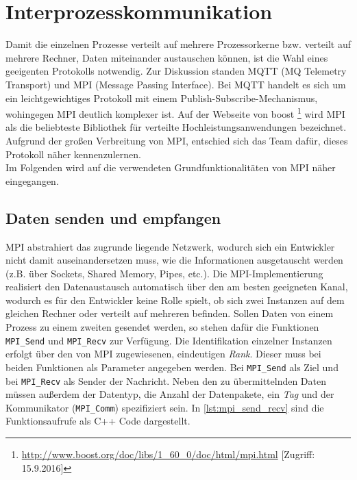 \documentclass[12pt,a4paper]{scrreprt}
\begin{document}
\section{Interprozesskommunikation}
\label{sec:interprozesskommunikation}

Damit die einzelnen Prozesse verteilt auf mehrere Prozessorkerne bzw. verteilt auf mehrere Rechner, Daten miteinander austauschen können, ist die Wahl eines geeigenten Protokolls notwendig. Zur Diskussion standen MQTT (MQ Telemetry Transport) und MPI (Message Passing Interface). Bei MQTT handelt es sich um ein leichtgewichtiges Protokoll mit einem Publish-Subscribe-Mechanismus, wohingegen MPI deutlich komplexer ist. Auf der Webseite von boost \footnote{\url{http://www.boost.org/doc/libs/1_60_0/doc/html/mpi.html} [Zugriff: 15.9.2016]} wird MPI als die beliebteste Bibliothek für verteilte Hochleistungsanwendungen bezeichnet. Aufgrund der großen Verbreitung von MPI, entschied sich das Team dafür, dieses Protokoll näher kennenzulernen.\\
Im Folgenden wird auf die verwendeten Grundfunktionalitäten von MPI näher eingegangen.

\subsection{Daten senden und empfangen}
\label{subsec:daten_senden_und_empfangen}

MPI abstrahiert das zugrunde liegende Netzwerk, wodurch sich ein Entwickler nicht damit auseinandersetzen muss, wie die Informationen ausgetauscht werden (z.B. über Sockets, Shared Memory, Pipes, etc.). Die MPI-Implementierung realisiert den Datenaustausch automatisch über den am besten geeigneten Kanal, wodurch es für den Entwickler keine Rolle spielt, ob sich zwei Instanzen auf dem gleichen Rechner oder verteilt auf mehreren befinden. Sollen Daten von einem Prozess zu einem zweiten gesendet werden, so stehen dafür die Funktionen \lstinline$MPI_Send$ und \lstinline$MPI_Recv$ zur Verfügung. Die Identifikation einzelner Instanzen erfolgt über den von MPI zugewiesenen, eindeutigen \textit{Rank}. Dieser muss bei beiden Funktionen als Parameter angegeben werden. Bei \lstinline$MPI_Send$ als Ziel und bei \lstinline$MPI_Recv$ als Sender der Nachricht. Neben den zu übermittelnden Daten müssen außerdem der Datentyp, die Anzahl der Datenpakete, ein \textit{Tag} und der Kommunikator (\lstinline$MPI_Comm$) spezifiziert sein. In \autoref{lst:mpi_send_recv} sind die Funktionsaufrufe als C++ Code dargestellt.
\end{document}
